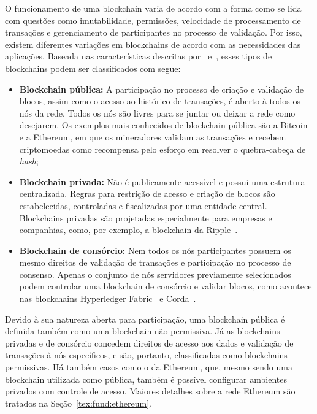 O funcionamento de uma blockchain varia de acordo com a forma como se lida com questões como imutabilidade, permissões, velocidade de processamento de transações  e gerenciamento de participantes no processo de validação. Por isso, existem diferentes variações em blockchains de acordo com as necessidades das aplicações. Baseada nas características descritas por~ e~, esses tipos de blockchains podem ser classificados com segue:

\begin{itemize}
    \item \textbf{Blockchain pública:} A participação no processo de criação e validação de blocos, assim como o acesso ao histórico de transações, é aberto à todos os nós da rede. Todos os nós são livres para se juntar ou deixar a rede como desejarem. Os exemplos mais conhecidos de blockchain pública são a Bitcoin e a Ethereum, em que os mineradores validam as transações e recebem criptomoedas como recompensa pelo esforço em resolver o quebra-cabeça de \textit{hash};
    \item \textbf{Blockchain privada:} Não é publicamente acessível e possui uma estrutura centralizada. Regras para restrição de acesso e criação de blocos são estabelecidas, controladas e fiscalizadas por uma entidade central. Blockchains privadas são projetadas especialmente para empresas e companhias, como, por exemplo, a blockchain da Ripple~\cite{overview-schwartz2014ripple}. 
    \item \textbf{Blockchain de consórcio:} Nem todos os nós participantes possuem os mesmo direitos de validação de transações e participação no processo de consenso. Apenas o conjunto de nós servidores previamente selecionados podem controlar uma blockchain de consórcio e validar blocos, como acontece nas blockchains Hyperledger Fabric~\cite{overview-hyperledger2018androulaki} e Corda~\cite{brown2016corda}. 
\end{itemize}

Devido à sua natureza aberta para participação, uma blockchain pública é definida também como uma blockchain não permissiva. Já as blockchains privadas e de consórcio concedem direitos de acesso aos dados e validação de transações à nós específicos, e são, portanto, classificadas como blockchains permissivas. Há também casos como o da Ethereum, que, mesmo sendo uma blockchain utilizada como pública, também é possível configurar ambientes privados com controle de acesso. Maiores detalhes sobre a rede Ethereum são tratados na Seção~\ref{tex:fund:ethereum}.

